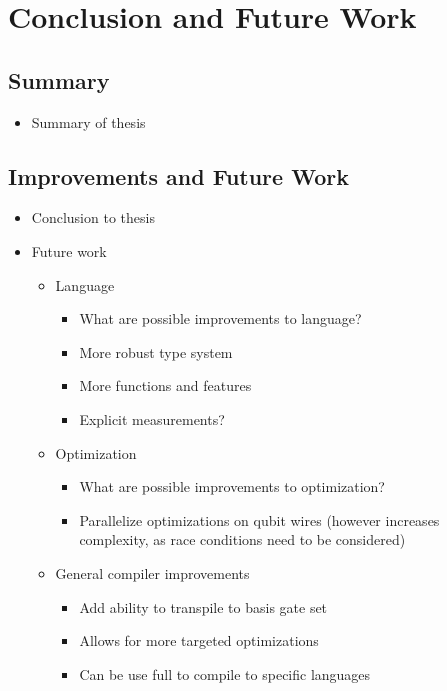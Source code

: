 \chapter{Conclusion and Future Work}

\section{Summary}
\begin{itemize}
    \item Summary of thesis
\end{itemize}

\section{Improvements and Future Work}
\begin{itemize}
    \item Conclusion to thesis
    \item Future work
    \begin{itemize}
        \item Language
        \begin{itemize}
            \item What are possible improvements to language?
            \item More robust type system
            \item More functions and features
            \item Explicit measurements?
        \end{itemize}
        \item Optimization
        \begin{itemize}
            \item What are possible improvements to optimization?
            \item Parallelize optimizations on qubit wires (however increases complexity, as race conditions need to be considered)
        \end{itemize}
        \item General compiler improvements
        \begin{itemize}
            \item Add ability to transpile to basis gate set
            \item Allows for more targeted optimizations
            \item Can be use full to compile to specific languages
        \end{itemize}
    \end{itemize}

\end{itemize}